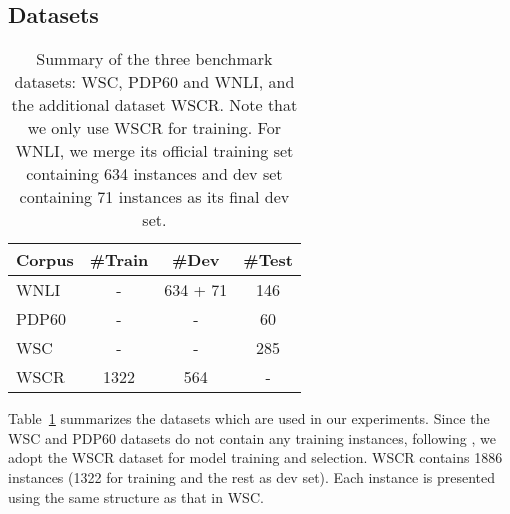 \documentclass[11pt,a4paper]{article}
\newcommand{\wsc}{WSC}
\begin{document}
\subsection{Datasets}
\label{subsec:data}
\begin{table}[htb!]
	\begin{center}
		\begin{tabular}{l|c|c|c}
			\hline \bf Corpus & \#Train & \#Dev & \#Test\\ \hline \hline
            WNLI& - & 634 + 71& 146  \\ \hline
            PDP60 &-& -& 60  \\ \hline
            {\wsc} &-& -& 285  \\ \hline
            WSCR &1322&564 &-   \\ \hline
		\end{tabular}
	\end{center}
\caption{Summary of the three benchmark datasets: {\wsc}, PDP60 and WNLI, and the additional dataset WSCR. Note that we only use WSCR for training. For WNLI, we merge its official training set containing 634 instances and dev set containing 71 instances as its final dev set.
	}
	\label{tab:datasets}
\end{table}
Table~\ref{tab:datasets} summarizes the datasets which are used in our experiments. 
Since the {\wsc} and PDP60 datasets do not contain any training instances, following \cite{kocijan2019surprisingly}, we adopt the WSCR dataset \cite{rahman2012resolving} for model training and selection. 
WSCR contains 1886 instances (1322 for training and the rest as dev set). 
Each instance is presented using the same structure as that in WSC. 
\end{document}
